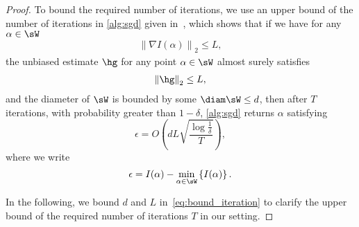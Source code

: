 \begin{proof}
To bound the required number of iterations, we use an upper bound of the number of iterations in \cref{alg:sgd} given in~\cite{pmlr-v99-jain19a}, which shows that if we have for any $\alpha\in\sW$
\begin{align}
  \left\|\nabla I(\alpha)\right\|_2\leq L,
\end{align}
the unbiased estimate $\hg$ for any point $\alpha\in\sW$ almost surely satisfies
\begin{align}
  \left\|\hg\right\|_2\leq L,
\end{align}
and the diameter of $\sW$ is bounded by some $\diam\sW\leq d$,
then after $T$ iterations, with probability greater than $1-\delta$, \cref{alg:sgd} returns $\alpha$ satisfying
\begin{equation}
  \label{eq:bound_iteration}
  \epsilon= O\left(dL\sqrt{\frac{\log\frac{1}{\delta}}{T}}\right),
\end{equation}
where we write
\begin{equation}
  \epsilon=I(\alpha)-\min_{\alpha\in\sW}\left\{I(\alpha)\right\}.
\end{equation}

In the following, we bound $d$ and $L$ in~\cref{eq:bound_iteration} to clarify the upper bound of the required number of iterations $T$ in our setting.


\end{proof}
